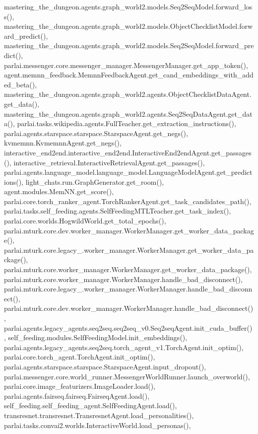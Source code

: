 mastering\+\_\+the\+\_\+dungeon.\+agents.\+graph\+\_\+world2.\+models.\+Seq2\+Seq\+Model.\+forward\+\_\+loss(), mastering\+\_\+the\+\_\+dungeon.\+agents.\+graph\+\_\+world2.\+models.\+Object\+Checklist\+Model.\+forward\+\_\+predict(), mastering\+\_\+the\+\_\+dungeon.\+agents.\+graph\+\_\+world2.\+models.\+Seq2\+Seq\+Model.\+forward\+\_\+predict(), parlai.\+messenger.\+core.\+messenger\+\_\+manager.\+Messenger\+Manager.\+get\+\_\+app\+\_\+token(), agent.\+memnn\+\_\+feedback.\+Memnn\+Feedback\+Agent.\+get\+\_\+cand\+\_\+embeddings\+\_\+with\+\_\+added\+\_\+beta(), mastering\+\_\+the\+\_\+dungeon.\+agents.\+graph\+\_\+world2.\+agents.\+Object\+Checklist\+Data\+Agent.\+get\+\_\+data(), mastering\+\_\+the\+\_\+dungeon.\+agents.\+graph\+\_\+world2.\+agents.\+Seq2\+Seq\+Data\+Agent.\+get\+\_\+data(), parlai.\+tasks.\+wikipedia.\+agents.\+Full\+Teacher.\+get\+\_\+extraction\+\_\+instructions(), parlai.\+agents.\+starspace.\+starspace.\+Starspace\+Agent.\+get\+\_\+negs(), kvmemnn.\+Kvmemnn\+Agent.\+get\+\_\+negs(), interactive\+\_\+end2end.\+interactive\+\_\+end2end.\+Interactive\+End2end\+Agent.\+get\+\_\+passages(), interactive\+\_\+retrieval.\+Interactive\+Retrieval\+Agent.\+get\+\_\+passages(), parlai.\+agents.\+language\+\_\+model.\+language\+\_\+model.\+Language\+Model\+Agent.\+get\+\_\+predictions(), light\+\_\+chats.\+run.\+Graph\+Generator.\+get\+\_\+room(), agent.\+modules.\+Mem\+N\+N.\+get\+\_\+score(), parlai.\+core.\+torch\+\_\+ranker\+\_\+agent.\+Torch\+Ranker\+Agent.\+get\+\_\+task\+\_\+candidates\+\_\+path(), parlai.\+tasks.\+self\+\_\+feeding.\+agents.\+Self\+Feeding\+M\+T\+L\+Teacher.\+get\+\_\+task\+\_\+index(), parlai.\+core.\+worlds.\+Hogwild\+World.\+get\+\_\+total\+\_\+epochs(), parlai.\+mturk.\+core.\+dev.\+worker\+\_\+manager.\+Worker\+Manager.\+get\+\_\+worker\+\_\+data\+\_\+package(), parlai.\+mturk.\+core.\+legacy\+\_.\+worker\+\_\+manager.\+Worker\+Manager.\+get\+\_\+worker\+\_\+data\+\_\+package(), parlai.\+mturk.\+core.\+worker\+\_\+manager.\+Worker\+Manager.\+get\+\_\+worker\+\_\+data\+\_\+package(), parlai.\+mturk.\+core.\+worker\+\_\+manager.\+Worker\+Manager.\+handle\+\_\+bad\+\_\+disconnect(), parlai.\+mturk.\+core.\+legacy\+\_.\+worker\+\_\+manager.\+Worker\+Manager.\+handle\+\_\+bad\+\_\+disconnect(), parlai.\+mturk.\+core.\+dev.\+worker\+\_\+manager.\+Worker\+Manager.\+handle\+\_\+bad\+\_\+disconnect(), parlai.\+agents.\+legacy\+\_\+agents.\+seq2seq.\+seq2seq\+\_\+v0.\+Seq2seq\+Agent.\+init\+\_\+cuda\+\_\+buffer(), self\+\_\+feeding.\+modules.\+Self\+Feeding\+Model.\+init\+\_\+embeddings(), parlai.\+agents.\+legacy\+\_\+agents.\+seq2seq.\+torch\+\_\+agent\+\_\+v1.\+Torch\+Agent.\+init\+\_\+optim(), parlai.\+core.\+torch\+\_\+agent.\+Torch\+Agent.\+init\+\_\+optim(), parlai.\+agents.\+starspace.\+starspace.\+Starspace\+Agent.\+input\+\_\+dropout(), parlai.\+messenger.\+core.\+world\+\_\+runner.\+Messenger\+World\+Runner.\+launch\+\_\+overworld(), parlai.\+core.\+image\+\_\+featurizers.\+Image\+Loader.\+load(), parlai.\+agents.\+fairseq.\+fairseq.\+Fairseq\+Agent.\+load(), self\+\_\+feeding.\+self\+\_\+feeding\+\_\+agent.\+Self\+Feeding\+Agent.\+load(), transresnet.\+transresnet.\+Transresnet\+Agent.\+load\+\_\+personalities(), parlai.\+tasks.\+convai2.\+worlds.\+Interactive\+World.\+load\+\_\+personas(), 